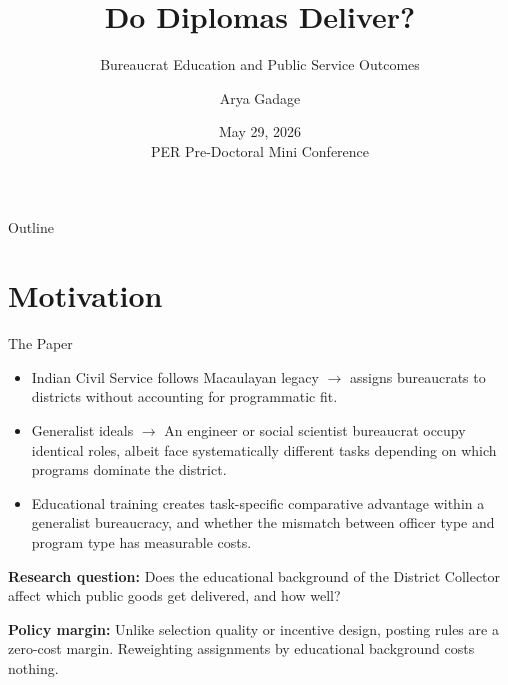 \documentclass[aspectratio=169]{beamer}
\title{Do Diplomas Deliver?}
\subtitle{Bureaucrat Education and Public Service Outcomes}
\author{Arya Gadage}
\date{May 29, 2026\\ PER Pre-Doctoral Mini Conference}
\begin{document}
\begin{frame}
\titlepage
\end{frame}

\begin{frame}{Outline}
\tableofcontents
\end{frame}

\section{Motivation}

\begin{frame}{The Paper}
\bigskip
\begin{itemize}
\item Indian Civil Service follows Macaulayan legacy $\rightarrow$  assigns bureaucrats to districts without accounting for programmatic fit.
\item Generalist ideals $\rightarrow$  An engineer or social scientist bureaucrat occupy identical roles, albeit face systematically different tasks depending on which programs dominate the district.
\item Educational training creates task-specific comparative advantage within a generalist bureaucracy, and whether the mismatch between officer type and program type has measurable costs.
\end{itemize}
\bigskip
\textbf{Research question:} Does the educational background of the District Collector affect which public goods get delivered, and how well?

\bigskip
\textbf{Policy margin:} Unlike selection quality or incentive design, posting rules are a zero-cost margin. Reweighting assignments by educational background costs nothing.

\end{frame}
\end{document}
